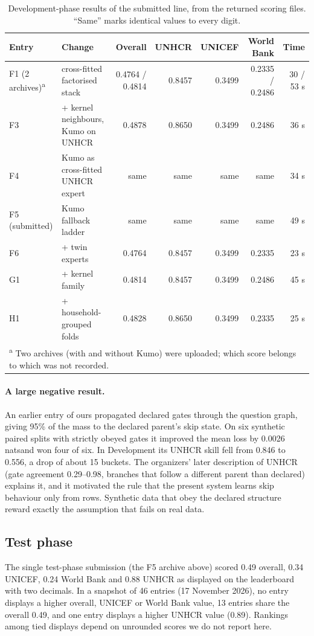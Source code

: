 \documentclass[10pt]{article}
\newcommand{\nats}{\,nats}
\begin{document}
\begin{table}[t]
\centering\small
\caption{Development-phase results of the submitted line, from the returned scoring files. ``Same'' marks identical values to every digit.}
\label{tab:devhist}
\begin{tabular}{llrrrrr}
\toprule
Entry & Change & Overall & UNHCR & UNICEF & World Bank & Time \\
\midrule
F1 (2 archives)\textsuperscript{a} & cross-fitted factorised stack & 0.4764 / 0.4814 & 0.8457 & 0.3499 & 0.2335 / 0.2486 & 30 / 53 s \\
F3 & + kernel neighbours, Kumo on UNHCR & 0.4878 & 0.8650 & 0.3499 & 0.2486 & 36 s \\
F4 & Kumo as cross-fitted UNHCR expert & same & same & same & same & 34 s \\
F5 (submitted) & Kumo fallback ladder & same & same & same & same & 49 s \\
F6 & + twin experts & 0.4764 & 0.8457 & 0.3499 & 0.2335 & 23 s \\
G1 & + kernel family & 0.4814 & 0.8457 & 0.3499 & 0.2486 & 45 s \\
H1 & + household-grouped folds & 0.4828 & 0.8650 & 0.3499 & 0.2335 & 25 s \\
\bottomrule
\multicolumn{7}{l}{\footnotesize \textsuperscript{a} Two archives (with and without Kumo) were uploaded; which score belongs to which was not recorded.}
\end{tabular}
\end{table}

\paragraph{A large negative result.} An earlier entry of ours propagated declared gates through the question graph, giving 95\% of the mass to the declared parent's skip state. On six synthetic paired splits with strictly obeyed gates it improved the mean loss by 0.0026\nats and won four of six. In Development its UNHCR skill fell from 0.846 to 0.556, a drop of about 15 buckets. The organizers' later description of UNHCR (gate agreement 0.29--0.98, branches that follow a different parent than declared) explains it, and it motivated the rule that the present system learns skip behaviour only from rows. Synthetic data that obey the declared structure reward exactly the assumption that fails on real data.

\subsection{Test phase}
The single test-phase submission (the F5 archive above) scored 0.49 overall, 0.34 UNICEF, 0.24 World Bank and 0.88 UNHCR as displayed on the leaderboard with two decimals. In a snapshot of 46 entries (17 November 2026), no entry displays a higher overall, UNICEF or World Bank value, 13 entries share the overall 0.49, and one entry displays a higher UNHCR value (0.89). Rankings among tied displays depend on unrounded scores we do not report here.
\end{document}
